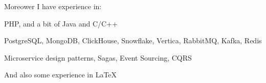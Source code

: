 Moreower I have experience in:
\begin{bulist}
\item PHP, and a bit of Java and C/C++
\item PostgreSQL, MongoDB, ClickHouse, Snowflake, Vertica, RabbitMQ, Kafka,
  Redis
\item Microservice design patterns, Sagas, Event Sourcing, CQRS
\end{bulist}
And also some experience in \LaTeX
